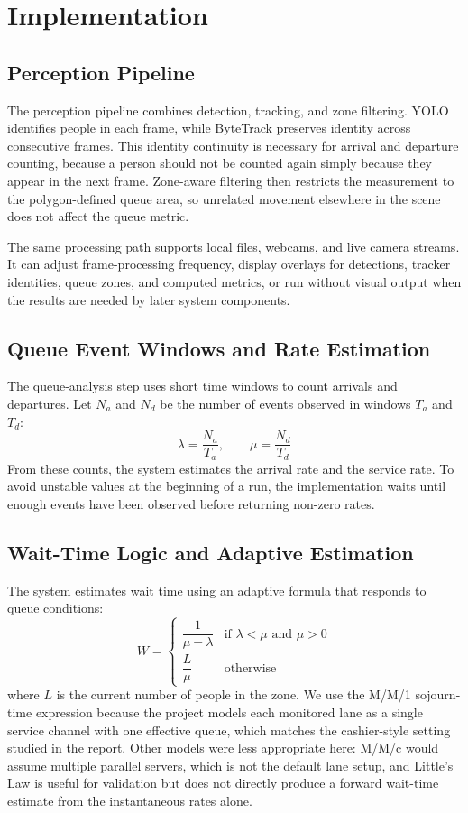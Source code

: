 \section{Implementation}

\subsection{Perception Pipeline}
The perception pipeline combines detection, tracking, and zone filtering. YOLO identifies people in each frame, while ByteTrack preserves identity across consecutive frames. This identity continuity is necessary for arrival and departure counting, because a person should not be counted again simply because they appear in the next frame. Zone-aware filtering then restricts the measurement to the polygon-defined queue area, so unrelated movement elsewhere in the scene does not affect the queue metric.

The same processing path supports local files, webcams, and live camera streams. It can adjust frame-processing frequency, display overlays for detections, tracker identities, queue zones, and computed metrics, or run without visual output when the results are needed by later system components.

\subsection{Queue Event Windows and Rate Estimation}
The queue-analysis step uses short time windows to count arrivals and departures. Let $N_a$ and $N_d$ be the number of events observed in windows $T_a$ and $T_d$:
\[
\lambda = \frac{N_a}{T_a}, \qquad \mu = \frac{N_d}{T_d}
\]
From these counts, the system estimates the arrival rate and the service rate. To avoid unstable values at the beginning of a run, the implementation waits until enough events have been observed before returning non-zero rates.

\subsection{Wait-Time Logic and Adaptive Estimation}
The system estimates wait time using an adaptive formula that responds to queue conditions:
\[
W = \begin{cases}
\dfrac{1}{\mu - \lambda} & \text{if } \lambda < \mu \text{ and } \mu > 0 \\
\dfrac{L}{\mu} & \text{otherwise}
\end{cases}
\]
where $L$ is the current number of people in the zone. We use the M/M/1 sojourn-time expression because the project models each monitored lane as a single service channel with one effective queue, which matches the cashier-style setting studied in the report. Other models were less appropriate here: M/M/c would assume multiple parallel servers, which is not the default lane setup, and Little's Law is useful for validation but does not directly produce a forward wait-time estimate from the instantaneous rates alone.


